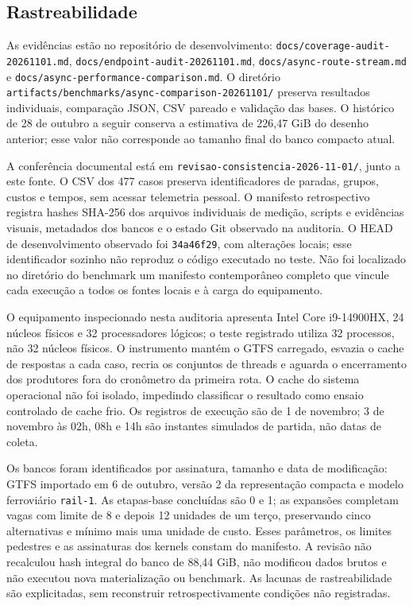\subsection{Rastreabilidade}
As evidências estão no repositório de desenvolvimento: \nolinkurl{docs/coverage-audit-20261101.md}, \nolinkurl{docs/endpoint-audit-20261101.md}, \nolinkurl{docs/async-route-stream.md} e \nolinkurl{docs/async-performance-comparison.md}. O diretório \nolinkurl{artifacts/benchmarks/async-comparison-20261101/} preserva resultados individuais, comparação JSON, CSV pareado e validação das bases. O histórico de 28 de outubro a seguir conserva a estimativa de 226,47 GiB do desenho anterior; esse valor não corresponde ao tamanho final do banco compacto atual.


A conferência documental está em \nolinkurl{revisao-consistencia-2026-11-01/}, junto a este fonte. O CSV dos 477 casos preserva identificadores de paradas, grupos, custos e tempos, sem acessar telemetria pessoal. O manifesto retrospectivo registra hashes SHA-256 dos arquivos individuais de medição, scripts e evidências visuais, metadados dos bancos e o estado Git observado na auditoria. O HEAD de desenvolvimento observado foi \texttt{34a46f29}, com alterações locais; esse identificador sozinho não reproduz o código executado no teste. Não foi localizado no diretório do benchmark um manifesto contemporâneo completo que vincule cada execução a todos os fontes locais e à carga do equipamento.

O equipamento inspecionado nesta auditoria apresenta Intel Core i9-14900HX, 24 núcleos físicos e 32 processadores lógicos; o teste registrado utiliza 32 processos, não 32 núcleos físicos. O instrumento mantém o GTFS carregado, esvazia o cache de respostas a cada caso, recria os conjuntos de threads e aguarda o encerramento dos produtores fora do cronômetro da primeira rota. O cache do sistema operacional não foi isolado, impedindo classificar o resultado como ensaio controlado de cache frio. Os registros de execução são de 1 de novembro; 3 de novembro às 02h, 08h e 14h são instantes simulados de partida, não datas de coleta.

Os bancos foram identificados por assinatura, tamanho e data de modificação: GTFS importado em 6 de outubro, versão 2 da representação compacta e modelo ferroviário \texttt{rail-1}. As etapas-base concluídas são 0 e 1; as expansões completam vagas com limite de 8 e depois 12 unidades de um terço, preservando cinco alternativas e mínimo mais uma unidade de custo. Esses parâmetros, os limites pedestres e as assinaturas dos kernels constam do manifesto. A revisão não recalculou hash integral do banco de 88,44 GiB, não modificou dados brutos e não executou nova materialização ou benchmark. As lacunas de rastreabilidade são explicitadas, sem reconstruir retrospectivamente condições não registradas.
